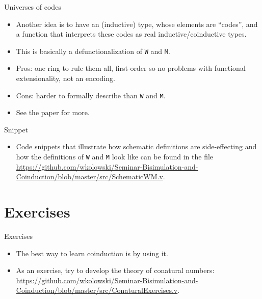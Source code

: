 \documentclass{beamer}
\begin{document}
\begin{frame}{Universes of codes}
\begin{itemize}
	\item Another idea is to have an (inductive) type, whose elements are ``codes'', and a function that interprets these codes as real inductive/coinductive types.
	\item This is basically a defunctionalization of \texttt{W} and \texttt{M}.
	\item Pros: one ring to rule them all, first-order so no problems with functional extensionality, not an encoding.
	\item Cons: harder to formally describe than \texttt{W} and \texttt{M}.
	\item See the paper \href{http://jmchapman.io/papers/levitation.pdf}{\color{blue}{The gentle art of levitation}} for more.
\end{itemize}
\end{frame}

\begin{frame}{Snippet}
\begin{itemize}
	\item Code snippets that illustrate how schematic definitions are side-effecting and how the definitions of \texttt{W} and \texttt{M} look like can be found in the file \url{https://github.com/wkolowski/Seminar-Bisimulation-and-Coinduction/blob/master/src/SchematicWM.v}.
\end{itemize}
\end{frame}

\section{Exercises}

\begin{frame}{Exercises}
\begin{itemize}
	\item The best way to learn coinduction is by using it.
	\item As an exercise, try to develop the theory of conatural numbers: \url{https://github.com/wkolowski/Seminar-Bisimulation-and-Coinduction/blob/master/src/ConaturalExercises.v}.
\end{itemize}
\end{frame}
\end{document}
